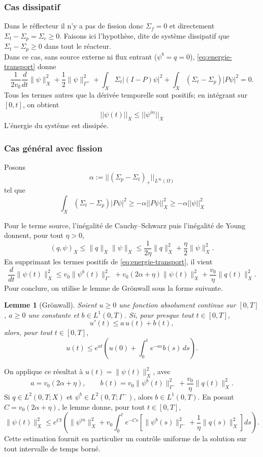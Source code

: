 \documentclass{article}
\newtheorem{lemma}[theorem]{Lemme}
\begin{document}
\subsubsection{Cas dissipatif}
Dans le réflecteur il n'y a pas de fission donc \(\Sigma_f = 0\) et directement \(\Sigma_t-\Sigma_p = \Sigma_c \ge 0\). Faisons ici l'hypothèse, dite de système dissipatif que \(\Sigma_t-\Sigma_p \ge 0\) dans tout le réacteur. \\
Dans ce cas, sans source externe ni flux entrant (\(\psi^b=q=0\)), \eqref{eq:energie-transport} donne
\[
 \frac1{2v_0}\frac{d}{dt}\|\psi\|_X^2
+\frac12\|\psi\|_{\Gamma^+}^2
+\int_X\Sigma_t|(I-P)\psi|^2
+\int_X(\Sigma_t-\Sigma_p)|P\psi|^2=0.
\]
Tous les termes autres que la dérivée temporelle sont positifs; en intégrant sur $[0,t]$, on obtient
 \begin{equation}
     ||\psi(t)||_X \le ||\psi^{in}||_X
 \end{equation}
 L'énergie du système est dissipée. 

 \subsubsection{Cas général avec fission}
Posons 
\[
\alpha := ||(\Sigma_p-\Sigma_t)_+||_{L^{\infty}(\Omega)}
\]
tel que  
\[ \int_X( \Sigma_t-\Sigma_p)|P\psi|^2 \ge -\alpha||P\psi||^2_X \ge -\alpha||\psi||^2_X\]
 
Pour le terme source, l'inégalité de Cauchy--Schwarz puis l'inégalité de Young donnent, pour tout $\eta>0$,
\[
(q,\psi)_X\leq \|q\|_X\|\psi\|_X
\leq \frac1{2\eta}\|q\|_X^2+\frac\eta2\|\psi\|_X^2.
\]
En supprimant les termes positifs de \eqref{eq:energie-transport}, il vient
\begin{equation}
\frac{d}{dt}\|\psi(t)\|_X^2
\leq v_0\|\psi^b(t)\|_{\Gamma^-}^2
+v_0(2\alpha+\eta)\|\psi(t)\|_X^2
+\frac{v_0}{\eta}\|q(t)\|_X^2.
\label{eq:energie-gronwall}
\end{equation}
Pour conclure, on utilise le lemme de Grönwall sous la forme suivante.

\begin{lemma}[Grönwall]
Soient $u\geq0$ une fonction absolument continue sur $[0,T]$, $a\geq0$ une constante et $b\in L^1(0,T)$. Si, pour presque tout $t\in[0,T]$,
\[
u'(t)\leq a\,u(t)+b(t),
\]
alors, pour tout $t\in[0,T]$,
\[
u(t)\leq e^{at}\left(u(0)+\int_0^t e^{-as}b(s)\,ds\right).
\]
\end{lemma}

On applique ce résultat à $u(t)=\|\psi(t)\|_X^2$, avec
\[
a=v_0(2\alpha+\eta),
\qquad
b(t)=v_0\|\psi^b(t)\|_{\Gamma^-}^2+\frac{v_0}{\eta}\|q(t)\|_X^2.
\]
Si $q\in L^2(0,T;X)$ et $\psi^b\in L^2(0,T;\Gamma^-)$, alors $b\in L^1(0,T)$. En posant $C=v_0(2\alpha+\eta)$, le lemme donne, pour tout $t\in[0,T]$,
\begin{equation}
\|\psi(t)\|_X^2\leq e^{Ct}\left(
\|\psi^{in}\|_X^2
+v_0\int_0^t e^{-Cs}\left[
\|\psi^b(s)\|_{\Gamma^-}^2+\frac1\eta\|q(s)\|_X^2
\right]ds\right).
\end{equation}
Cette estimation fournit en particulier un contrôle uniforme de la solution sur tout intervalle de temps borné.
\end{document}
